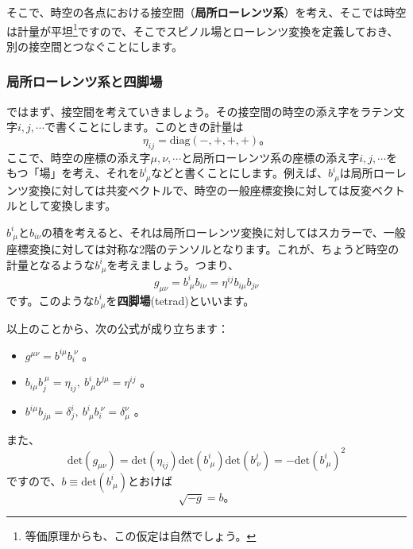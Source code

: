 \documentclass[unicode,a4paper,11pt]{ltjsarticle}
\begin{document}
そこで、時空の各点における接空間（\textbf{局所ローレンツ系}）を考え、そこでは時空は計量が平坦\footnote{
   等価原理からも、この仮定は自然でしょう。
}ですので、そこでスピノル場とローレンツ変換を定義しておき、別の接空間とつなぐことにします。

\subsubsection*{局所ローレンツ系と四脚場}

ではまず、接空間を考えていきましょう。その接空間の時空の添え字をラテン文字$i,j,\cdots$で書くことにします。このときの計量は
\begin{equation}
   \eta_{ij}
   =
   \mathrm{diag}(-,+,+,+)
   \mathrm{。}
\end{equation}
ここで、時空の座標の添え字$\mu,\nu,\cdots$と局所ローレンツ系の座標の添え字$i,j,\cdots$をもつ「場」を考え、それを$b^{i}_{\ \mu}$などと書くことにします。例えば、$b^{i}_{\ \mu}$は局所ローレンツ変換に対しては共変ベクトルで、時空の一般座標変換に対しては反変ベクトルとして変換します。

$b^{i}_{\ \mu}$と$b_{i\nu}$の積を考えると、それは局所ローレンツ変換に対してはスカラーで、一般座標変換に対しては対称な2階のテンソルとなります。これが、ちょうど時空の計量となるような$b^{i}_{\ \mu}$を考えましょう。つまり、
\begin{equation}
   g_{\mu\nu}
   =
   b^{i}_{\ \mu}b_{i\nu}
   =
   \eta^{ij}b_{i\mu}b_{j\nu}
\end{equation}
です。このような$b^{i}_{\ \mu}$を\textbf{四脚場}(tetrad)といいます。

以上のことから、次の公式が成り立ちます：
\begin{itemize}
   \item
         $g^{\mu\nu}=b^{i\mu}b^{\ \nu}_{i}$
         。
   \item
         $b_{i\mu}b^{\ \mu}_{j}=\eta_{ij},\ b^{i}_{\ \mu}b^{j\mu}=\eta^{ij}$
         。
   \item
         $b^{i\mu}b_{j\mu}=\delta^{i}_{j},\ b^{i}_{\ \mu}b_{i}^{\ \nu}=\delta^{\nu}_{\mu}$
         。
\end{itemize}

また、
\begin{equation}
   \mathrm{det}(g_{\mu\nu})
   =
   \mathrm{det}(\eta_{ij})\mathrm{det}(b^{i}_{\ \mu})\mathrm{det}(b^{j}_{\ \nu})
   =
   -\mathrm{det}(b^{i}_{\ \mu})^2
\end{equation}
ですので、$b\equiv\mathrm{det}(b^{i}_{\ \mu})$とおけば
\begin{equation}
   \sqrt{-g}=b
   \mathrm{。}
\end{equation}
\end{document}
